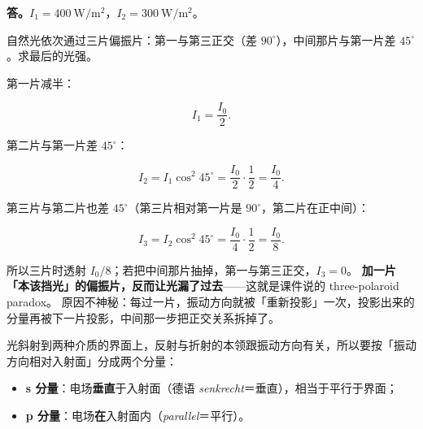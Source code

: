 \documentclass[11pt]{ctexart}
\begin{document}
\textbf{答。}$I_1=400\ \mathrm{W/m^2}$，$I_2=300\ \mathrm{W/m^2}$。



自然光依次通过三片偏振片：第一与第三正交（差 $90^\circ$），中间那片与第一片差 $45^\circ$。求最后的光强。

第一片减半：

\[
I_1=\frac{I_0}{2}.
\]

第二片与第一片差 $45^\circ$：

\[
I_2=I_1\cos^2 45^\circ=\frac{I_0}{2}\cdot\frac12=\frac{I_0}{4}.
\]

第三片与第二片也差 $45^\circ$（第三片相对第一片是 $90^\circ$，第二片在正中间）：

\[
I_3=I_2\cos^2 45^\circ=\frac{I_0}{4}\cdot\frac12=\frac{I_0}{8}.
\]

所以三片时透射 $I_0/8$；若把中间那片抽掉，第一与第三正交，$I_3=0$。
\textbf{加一片「本该挡光」的偏振片，反而让光漏了过去}——这就是课件说的 three-polaroid paradox。
原因不神秘：每过一片，振动方向就被「重新投影」一次，投影出来的分量再被下一片投影，中间那一步把正交关系拆掉了。





光斜射到两种介质的界面上，反射与折射的本领跟振动方向有关，所以要按「振动方向相对入射面」分成两个分量：

\begin{itemize}
\item \textbf{s 分量}：电场\textbf{垂直}于入射面（德语 \emph{senkrecht}＝垂直），相当于平行于界面；
\item \textbf{p 分量}：电场\textbf{在}入射面内（\emph{parallel}＝平行）。
\end{itemize}
\end{document}
